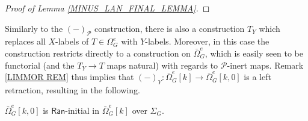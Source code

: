 \documentclass[a4paper,10pt]{article}%
\begin{document}
\begin{proof}[Proof of Lemma \ref{MINUS_LAN_FINAL_LEMMA}]
%
%  
\end{proof}


Similarly to the $(\minus)_{\mathcal{P}}$ construction,
there is also a construction $T_Y$ which replaces all $X$-labels of $T \in \Omega_G^e$ with $Y$-labels. Moreover, in this case the construction restricts directly to a construction on 
$\bar{\Omega}_G^e$,
which is easily seen to be functorial (and the $T_Y \to T$ maps natural) with regards to $\mathcal{P}$-inert maps. Remark \ref{LIMMOR REM} thus implies that 
$(\minus)_Y \colon \bar{\Omega}_G^e[k] \to 
\bar{\Omega}_G^e[k,0]$
is a left retraction, 
resulting in the following.
\begin{lemma}
  \label{ZERO_LAN_FINALITY_LEMMA}
  $\bar{\Omega}_G^{e}[k,0]$ is $\mathsf{Ran}$-initial in $\bar{\Omega}_G^e[k]$ over $\Sigma_G$.
\end{lemma}

\end{document}
